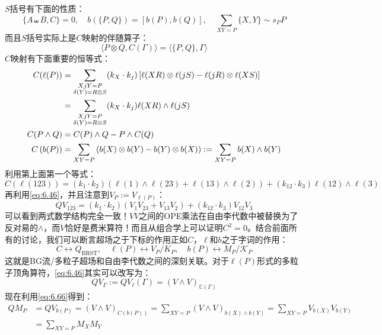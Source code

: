 $S$括号有下面的性质：
\begin{equation}
	\{A\shuffle B,C\}=0,\quad b(\{P,Q\})=[b(P),b(Q)],\quad \sum_{XY=P}\{X,Y\}\sim s_PP
\end{equation}
而且$S$括号实际上是$C$映射的伴随算子：
\begin{equation}
	\langle P\otimes Q,C(\Gamma)\rangle=\langle\{P,Q\},\Gamma\rangle
\end{equation}
$C$映射有下面重要的恒等式：
\begin{align}
	C(\ell(P))&=\sum_{\substack{XjY=P\\\delta(Y)=R\otimes S}}(k_X\cdot k_j)\left[\ell(XR)\otimes\ell(jS)-\ell(jR)\otimes\ell(XS)\right]\notag\\
	&=\sum_{\substack{XjY=P\\\delta(Y)=R\otimes S}}(k_X\cdot k_j)\ell(XR)\wedge\ell(jS)\\
	C(P\wedge Q)&=C(P)\wedge Q-P\wedge C(Q)\\
	\label{eq:6.66}
	C\left(b(P)\right)&=\sum_{XY=P}\left(b(X)\otimes b(Y)-b(Y)\otimes b(X)\right):=\sum_{XY=P}b(X)\wedge b(Y)
\end{align}
利用第上面第一个等式：
\begin{equation}
	C(\ell(123))=(k_1\cdot k_2)\left(\ell(1)\wedge\ell(23)+\ell(13)\wedge\ell(2)\right)+(k_{12}\cdot k_3)\ell(12)\wedge\ell(3)
\end{equation}
再利用\ref{eq:6.46}，并且注意到$V_P:=V_{\ell(P)}$：
\begin{equation}
	QV_{123}=(k_1\cdot k_2)\left(V_1V_{23}+V_{13}V_2\right)+(k_{12}\cdot k_3)V_{12}V_3
\end{equation}
可以看到两式数学结构完全一致！$VV$之间的OPE乘法在自由李代数中被替换为了反对易的$\wedge$，而$V$恰好是费米算符！而且从组合学上可以证明$C^2=0$。结合前面所有的讨论，我们可以断言超场之于下标的作用正如$C$，$\ell$和$b$之于字词的作用：
\begin{equation}
	\label{eq:6.69}
	\boxed{
		C\leftrightarrow Q_{\mathrm{BRST}},\quad\ell(P)\leftrightarrow V_P/K_P,\quad b(P)\leftrightarrow M_P/\mathcal{K}_P
	}
\end{equation}
这就是BG流/多粒子超场和自由李代数之间的深刻关联。对于$\ell(P)$形式的多粒子顶角算符，\ref{eq:6.46}其实可以改写为：
\begin{equation}
	QV_\Gamma:=QV_\ell(\Gamma)=(V\wedge V)_{\mathbb{C}(\Gamma)}
\end{equation}
现在利用\ref{eq:6.66}得到：
\begin{equation}
	\label{eq:6.71}
\begin{aligned}
		QM_P&=QV_{b(P)}=(V\wedge V)_{C(b(P))}=\sum_{XY=P}(V\wedge V)_{b(X)\wedge b(Y)}=\sum_{XY=P}V_{b(X)}V_{b(Y)}\\
	&=\sum_{XY=P}M_XM_Y
\end{aligned}
\end{equation}
